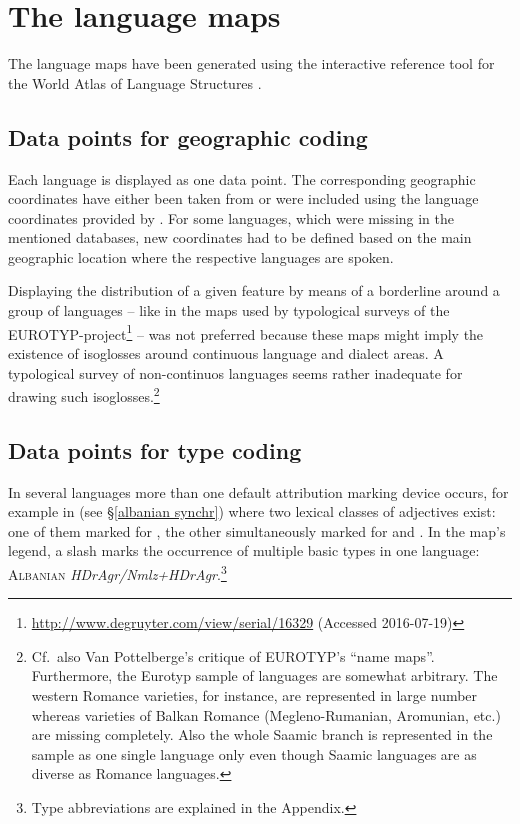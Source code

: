 \section{The language maps}
The language maps have been generated using the interactive reference tool 
for the World Atlas of Language Structures \citep{bibiko2005}. 

\subsection[Geographic coding]{Data points for geographic coding}
Each language is displayed as one data point. The corresponding geographic coordinates have either been taken from \cite{walsOnline2013} or were included using the language coordinates provided by \cite{AUTOTYP}. For some languages, which were missing in the mentioned databases, new coordinates had to be defined based on the main geographic location where the respective languages are spoken.

Displaying the distribution of a given feature by means of a borderline around a group of languages – like in the maps used by typological surveys of the EUROTYP\hyp{}project\footnote{\url{http://www.degruyter.com/view/serial/16329} (Accessed 2016-07-19)} – was not preferred because these maps might imply the existence of isoglosses around continuous language and dialect areas. A typological survey of non-continuos languages seems rather inadequate for drawing such isoglosses.\footnote{Cf.~also Van Pottelberge's \citeyear{van-pottelberge2001} critique of EUROTYP's “name maps”. Furthermore, the Eurotyp sample of languages are somewhat arbitrary. The western Romance varieties, for instance, are represented in large number whereas varieties of Balkan Romance (Megleno-Rumanian, Aromunian, etc.) are missing completely. Also the whole Saamic branch is represented in the  sample as one single language only even though Saamic languages are as diverse as Romance languages.}

\subsection[Type coding]{Data points for type coding}
In several languages more than one default attribution marking device occurs, for example in  (see \S\ref{albanian synchr}) where two lexical classes of adjectives exist: one of them marked for , the other simultaneously marked for  and . In the map's legend, a slash marks the occurrence of multiple basic types in one language: \textsc{Albanian} \textit{HDrAgr/Nmlz+HDrAgr}.\footnote{Type abbreviations are explained in the Appendix.}

